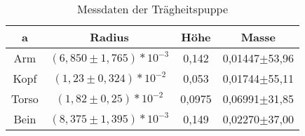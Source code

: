\begin{table}[h]
	\begin{center}
		\begin{tabular}{c|ccc}
				a	&Radius						&Höhe	&Masse \\ \hline
			Arm		&$(6,850\pm1,765)*10^{-3}$	&0,142	&0,01447$\pm$53,96\\
			Kopf	&$(1,23\pm0,324)*10^{-2}$	&0,053	&0,01744$\pm$55,11\\
			Torso	&$(1,82\pm0,25)*10^{-2}$	&0,0975	&0,06991$\pm$31,85\\
			Bein	&$(8,375\pm1,395)*10^{-3}$	&0,149	&0,02270$\pm$37,00%
		\end{tabular}
		\caption{Messdaten der Trägheitspuppe}
		\label{tab:puppe}
	\end{center}
\end{table}